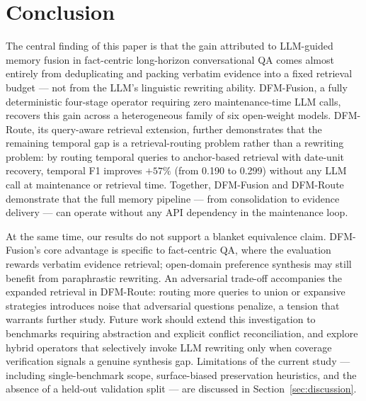 \section{Conclusion}
\label{sec:conclusion}

The central finding of this paper is that the gain attributed to LLM-guided memory fusion in fact-centric long-horizon conversational QA comes almost entirely from deduplicating and packing verbatim evidence into a fixed retrieval budget --- not from the LLM's linguistic rewriting ability.
DFM-Fusion, a fully deterministic four-stage operator requiring zero maintenance-time LLM calls, recovers this gain across a heterogeneous family of six open-weight models.
DFM-Route, its query-aware retrieval extension, further demonstrates that the remaining temporal gap is a retrieval-routing problem rather than a rewriting problem: by routing temporal queries to anchor-based retrieval with date-unit recovery, temporal F1 improves $+57\%$ (from 0.190 to 0.299) without any LLM call at maintenance or retrieval time.
Together, DFM-Fusion and DFM-Route demonstrate that the full memory pipeline --- from consolidation to evidence delivery --- can operate without any API dependency in the maintenance loop.

At the same time, our results do not support a blanket equivalence claim.
DFM-Fusion's core advantage is specific to fact-centric QA, where the evaluation rewards verbatim evidence retrieval; open-domain preference synthesis may still benefit from paraphrastic rewriting.
An adversarial trade-off accompanies the expanded retrieval in DFM-Route: routing more queries to union or expansive strategies introduces noise that adversarial questions penalize, a tension that warrants further study.
Future work should extend this investigation to benchmarks requiring abstraction and explicit conflict reconciliation, and explore hybrid operators that selectively invoke LLM rewriting only when coverage verification signals a genuine synthesis gap.
Limitations of the current study --- including single-benchmark scope, surface-biased preservation heuristics, and the absence of a held-out validation split --- are discussed in Section~\ref{sec:discussion}.
